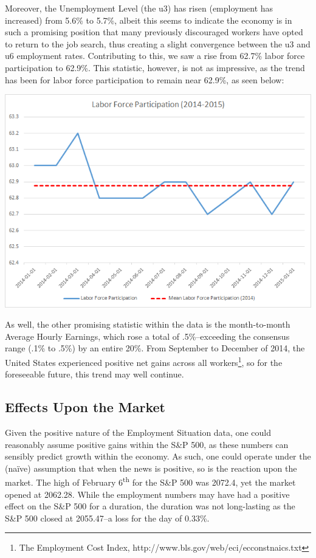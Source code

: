 \documentclass[11pt,letterpaper,english]{article}
\begin{document}
Moreover, the Unemployment Level (the u3) has risen (employment has increased) from 5.6\% to 5.7\%, albeit this seems to indicate the economy is in such a promising position that many previously discouraged workers have opted to return to the job search, thus creating a slight convergence between the u3 and u6 employment rates. 
Contributing to this, we saw a rise from 62.7\% labor force participation to 62.9\%. This statistic, however, is not as impressive, as the trend has been for labor force participation to remain near 62.9\%, as seen below:

\includegraphics[scale=0.85]{LaborForceParticipation.png}
\vspace{5mm}

As well, the other promising statistic within the data is the month-to-month Average Hourly Earnings, which rose a total of .5\%--exceeding the consensus range (.1\% to .5\%) by an entire 20\%. From September to December of 2014, the United States experienced positive net gains across all workers\footnote[1]{ The Employment Cost Index, http://www.bls.gov/web/eci/ecconstnaics.txt}, so for the foreseeable future, this trend may well continue.

\subsection{Effects Upon the Market}
Given the positive nature of the Employment Situation data, one could reasonably assume positive gains within the S\&P 500, as these numbers can sensibly predict growth within the economy. As such, one could operate under the (naïve) assumption that when the news is positive, so is the reaction upon the market. The high of February 6\textsuperscript{th} for the S\&P 500 was 2072.4, yet the market opened at 2062.28. While the employment numbers may have had a positive effect on the S\&P 500 for a duration, the duration was not long-lasting as the S\&P 500 closed at 2055.47--a loss for the day of 0.33\%.
\end{document}
